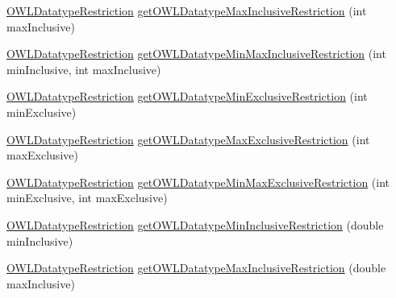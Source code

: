 \begin{DoxyCompactItemize}
\item 
\hyperlink{interfaceorg_1_1semanticweb_1_1owlapi_1_1model_1_1_o_w_l_datatype_restriction}{O\-W\-L\-Datatype\-Restriction} \hyperlink{classuk_1_1ac_1_1manchester_1_1cs_1_1owl_1_1owlapi_1_1_o_w_l_data_factory_impl_af87f8849f71e7deb8b11c5ac20ca0d42}{get\-O\-W\-L\-Datatype\-Max\-Inclusive\-Restriction} (int max\-Inclusive)
\item 
\hyperlink{interfaceorg_1_1semanticweb_1_1owlapi_1_1model_1_1_o_w_l_datatype_restriction}{O\-W\-L\-Datatype\-Restriction} \hyperlink{classuk_1_1ac_1_1manchester_1_1cs_1_1owl_1_1owlapi_1_1_o_w_l_data_factory_impl_abba84ab2bb900891a7979c13b3a4f3a1}{get\-O\-W\-L\-Datatype\-Min\-Max\-Inclusive\-Restriction} (int min\-Inclusive, int max\-Inclusive)
\item 
\hyperlink{interfaceorg_1_1semanticweb_1_1owlapi_1_1model_1_1_o_w_l_datatype_restriction}{O\-W\-L\-Datatype\-Restriction} \hyperlink{classuk_1_1ac_1_1manchester_1_1cs_1_1owl_1_1owlapi_1_1_o_w_l_data_factory_impl_a75ea3c0d6649aa2be4f7c939b2a23a96}{get\-O\-W\-L\-Datatype\-Min\-Exclusive\-Restriction} (int min\-Exclusive)
\item 
\hyperlink{interfaceorg_1_1semanticweb_1_1owlapi_1_1model_1_1_o_w_l_datatype_restriction}{O\-W\-L\-Datatype\-Restriction} \hyperlink{classuk_1_1ac_1_1manchester_1_1cs_1_1owl_1_1owlapi_1_1_o_w_l_data_factory_impl_a9812a7a8828c3cde673dc4d845702194}{get\-O\-W\-L\-Datatype\-Max\-Exclusive\-Restriction} (int max\-Exclusive)
\item 
\hyperlink{interfaceorg_1_1semanticweb_1_1owlapi_1_1model_1_1_o_w_l_datatype_restriction}{O\-W\-L\-Datatype\-Restriction} \hyperlink{classuk_1_1ac_1_1manchester_1_1cs_1_1owl_1_1owlapi_1_1_o_w_l_data_factory_impl_a503dc57bec5159696a2c2774d898b097}{get\-O\-W\-L\-Datatype\-Min\-Max\-Exclusive\-Restriction} (int min\-Exclusive, int max\-Exclusive)
\item 
\hyperlink{interfaceorg_1_1semanticweb_1_1owlapi_1_1model_1_1_o_w_l_datatype_restriction}{O\-W\-L\-Datatype\-Restriction} \hyperlink{classuk_1_1ac_1_1manchester_1_1cs_1_1owl_1_1owlapi_1_1_o_w_l_data_factory_impl_ad9ec65d86298cb6ed9ddd6061657ec3e}{get\-O\-W\-L\-Datatype\-Min\-Inclusive\-Restriction} (double min\-Inclusive)
\item 
\hyperlink{interfaceorg_1_1semanticweb_1_1owlapi_1_1model_1_1_o_w_l_datatype_restriction}{O\-W\-L\-Datatype\-Restriction} \hyperlink{classuk_1_1ac_1_1manchester_1_1cs_1_1owl_1_1owlapi_1_1_o_w_l_data_factory_impl_a33e052a82a67b053a362e3a340d0ffc9}{get\-O\-W\-L\-Datatype\-Max\-Inclusive\-Restriction} (double max\-Inclusive)

\end{DoxyCompactItemize}
